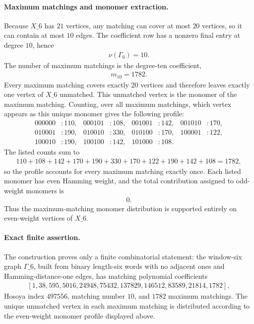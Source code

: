 \paragraph{Maximum matchings and monomer extraction.}
Because \(X\_6\) has \(21\) vertices, any matching can cover at most \(20\) vertices, so it can contain at most \(10\) edges. The coefficient row has a nonzero final entry at degree \(10\), hence
$$
\begin{aligned}
\nu(\Gamma_6)=10.
\end{aligned}
$$
The number of maximum matchings is the degree-ten coefficient,
$$
\begin{aligned}
 m_{10}=1782.
\end{aligned}
$$
Every maximum matching covers exactly \(20\) vertices and therefore leaves exactly one vertex of \(X\_6\) unmatched. This unmatched vertex is the monomer of the maximum matching. Counting, over all maximum matchings, which vertex appears as this unique monomer gives the following profile:
$$
\begin{aligned}
000000&:110, &000101&:108, &001001&:142, &001010&:170,\\
010001&:190, &010010&:330, &010100&:170, &100001&:122,\\
100010&:190, &100100&:142, &101000&:108.
\end{aligned}
$$
The listed counts sum to
$$
\begin{aligned}
110+108+142+170+190+330+170+122+190+142+108=1782,
\end{aligned}
$$
so the profile accounts for every maximum matching exactly once. Each listed monomer has even Hamming weight, and the total contribution assigned to odd-weight monomers is
$$
\begin{aligned}
0.
\end{aligned}
$$
Thus the maximum-matching monomer distribution is supported entirely on even-weight vertices of \(X\_6\).

\paragraph{Exact finite assertion.}
The construction proves only a finite combinatorial statement: the window-six graph \(\Gamma\_6\), built from binary length-six words with no adjacent ones and Hamming-distance-one edges, has matching polynomial coefficients
$$
\begin{aligned}
[1,38,595,5016,24948,75432,137829,146512,83589,21814,1782],
\end{aligned}
$$
Hosoya index \(497556\), matching number \(10\), and \(1782\) maximum matchings. The unique unmatched vertex in each maximum matching is distributed according to the even-weight monomer profile displayed above.

